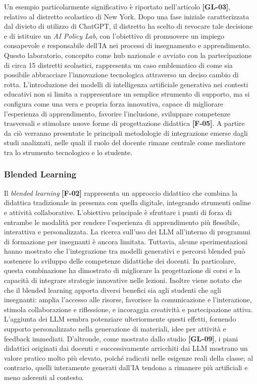 \documentclass[a4paper,9pt]{article}
\begin{document}
Un esempio particolarmente significativo è riportato nell’articolo \textbf{[GL-03]}, relativo al distretto scolastico di New York. Dopo una fase iniziale caratterizzata dal divieto di utilizzo di ChatGPT, il distretto ha scelto di revocare tale decisione e di istituire un \emph{AI Policy Lab}, con l’obiettivo di promuovere un impiego consapevole e responsabile dell’IA nei processi di insegnamento e apprendimento. Questo laboratorio, concepito come hub nazionale e avviato con la partecipazione di circa 15 distretti scolastici, rappresenta un caso emblematico di come sia possibile abbracciare l’innovazione tecnologica attraverso un deciso cambio di rotta.
L’introduzione dei modelli di intelligenza artificiale generativa nei contesti educativi non si limita a rappresentare un semplice strumento di supporto, ma si configura come una vera e propria forza innovativa, capace di migliorare l’esperienza di apprendimento, favorire l’inclusione, sviluppare competenze trasversali e stimolare nuove forme di progettazione didattica \textbf{[F-05]}. A partire da ciò verranno presentate le principali metodologie di integrazione emerse dagli studi analizzati, nelle quali il ruolo del docente rimane centrale come mediatore tra lo strumento tecnologico e lo studente.

\subsubsection{Blended Learning}
Il \textit{blended learning} \textbf{[F-02]} rappresenta un approccio didattico che combina la didattica tradizionale in presenza con quella digitale, integrando strumenti online e attività collaborative. L’obiettivo principale è sfruttare i punti di forza di entrambe le modalità per rendere l’esperienza di apprendimento più flessibile, interattiva e personalizzata. La ricerca sull’uso dei LLM all’interno di programmi di formazione per insegnanti è ancora limitata. Tuttavia, alcune sperimentazioni hanno mostrato che l’integrazione tra modelli generativi e percorsi blended può sostenere lo sviluppo delle competenze didattiche dei docenti. In particolare, questa combinazione ha dimostrato di migliorare la progettazione di corsi e la capacità di integrare strategie innovative nelle lezioni. Inoltre viene notato che  che il blended learning apporta diversi benefici sia agli studenti che agli insegnanti: amplia l’accesso alle risorse, favorisce la comunicazione e l’interazione, stimola collaborazione e riflessione, e incoraggia creatività e partecipazione attiva. L’aggiunta dei LLM sembra potenziare ulteriormente questi effetti, fornendo supporto personalizzato nella generazione di materiali, idee per attività e feedback immediati. D'altronde, come mostrato dallo studio \textbf{[GL-09]}, i piani didattici originati dai docenti e successivamente arricchiti dai LLM mostrano un valore pratico molto più elevato, poiché radicati nelle esigenze reali della classe; al contrario, quelli interamente generati dall’IA tendono a rimanere più artificiali e meno aderenti al contesto.\\
\end{document}
